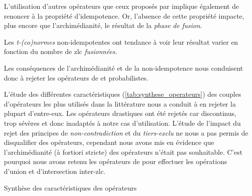 L'utilisation d'autres opérateurs que ceux proposés par
\textcite{Zadeh1965} implique également de renoncer à la propriété
d'idempotence. Or, l'absence de cette propriété impacte, plus encore
que l'archimédianité, le résultat de la \emph{phase de fusion.}

Les \emph{t-(co)normes} non-idempotentes ont tendance à voir leur
résultat varier en fonction du nombre de \ac{zlc} \emph{fusionnées.}

Les conséquences de l'archimédianité et de la non-idempotence nous
conduisent donc à rejeter les opérateurs de  et probabilistes.






L'étude des différentes caractéristiques
(\autoref{tab:synthese_operateurs}) des couples d'opérateurs les plus
utilisés dans la littérature nous a conduit à en rejeter la plupart
d'entre-eux. Les opérateurs drastiques ont été rejetés car
discontinus, trop sévères et donc inadaptés à notre cas
d'utilisation. L'étude de l'impact du rejet des principes de
\emph{non-contradiction} et du \emph{tiers-exclu} ne nous a pas permis
de disqualifier des opérateurs, cependant nous avons mis en évidence
que l'archimédianité (à fortiori stricte) des opérateurs n'était pas
souhaitable. C'est pourquoi nous avons retenu les opérateurs de
\textcite{Zadeh1965} pour effectuer les opérations d'union et
d'intersection inter-\ac{zlc}.

\begin{table}
  \centering
  
  \caption{Synthèse des caractéristiques des opérateurs}
  \label{tab:synthese_operateurs}
\end{table}


